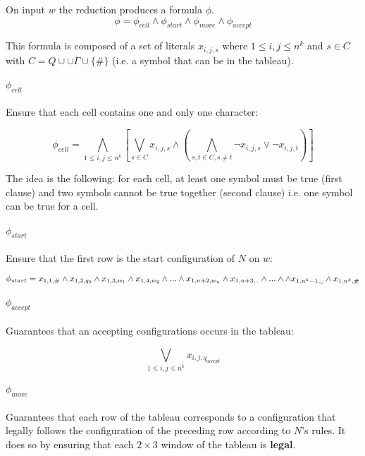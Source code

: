 \documentclass[letterpaper]{article}
\begin{document}
On input $w$ the reduction produces a formula $\phi$.
$$
\phi = \phi_{cell} \wedge \phi_{start} \wedge \phi_{move} \wedge \phi_{accept}
$$

This formula is composed of a set of literals $x_{i, j, s}$ where
 $1 \le i, j \le n^k$ and  $s \in C$ with
 $C = Q \cup \cup \Gamma \cup \{\#\}$ (i.e.
 a symbol that can be in the tableau).

\paragraph{$\phi_{cell}$}

Ensure that each cell contains one and only one character:

$$
\phi_{cell} = \bigwedge_{1 \le i, j \le n^k}\left[
\bigvee_{s \in C} x_{i, j, s}
\wedge
\left( \bigwedge_{s,t \in C, s \not= t}
\neg x_{i,j,s} \vee \neg x_{i,j,t}  \right)
\right]
$$

The idea is the following: for each cell, at least one symbol must be true
(first clause)
and two symbols cannot be true together (second clause) i.e. one symbol
can be true for a cell.

\paragraph{$\phi_{start}$}

Ensure that the first row is the start configuration of $N$ on $w$:

$$
\phi_{start} = x_{1, 1, \#} \wedge x_{1, 2, q_0}
\wedge x_{1, 3, w_1} \wedge x_{1, 4, w_2} \wedge ... \wedge x_{1, n+2, w_n}
\wedge x_{1, n+3, \text{\textvisiblespace}}
\wedge ... \wedge
\wedge x_{1, n^k-1, \text{\textvisiblespace}}
\wedge x_{1, n^k, \#}
$$

\paragraph{$\phi_{accept}$}

Guarantees that an accepting configurations occurs in the tableau:

$$
\bigvee_{1 \le i,j \le n^k} x_{i, j, q_{accept}}
$$

\paragraph{$\phi_{move}$}

Guarantees that each row of the tableau corresponds to a configuration
that legally follows the configuration of the preceding row according to
$N$'s rules. It does so by ensuring that each $2 \times 3$ window of the
tableau is \textbf{legal}.
\end{document}
